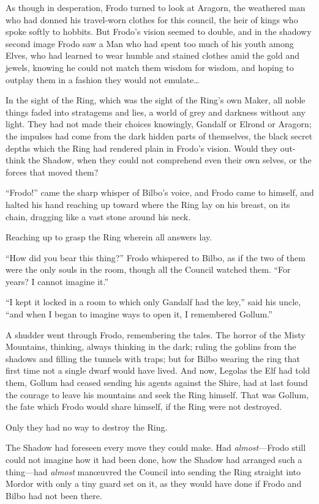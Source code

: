 As though in desperation, Frodo turned to look at Aragorn, the weathered man who had donned his travel-worn clothes for this council, the heir of kings who spoke softly to hobbits. But Frodo’s vision seemed to double, and in the shadowy second image Frodo saw a Man who had spent too much of his youth among Elves, who had learned to wear humble and stained clothes amid the gold and jewels, knowing he could not match them wisdom for wisdom, and hoping to outplay them in a fashion they would not emulate…

In the sight of the Ring, which was the sight of the Ring’s own Maker, all noble things faded into stratagems and lies, a world of grey and darkness without any light. They had not made their choices knowingly, Gandalf or Elrond or Aragorn; the impulses had come from the dark hidden parts of themselves, the black secret depths which the Ring had rendered plain in Frodo’s vision. Would they out-think the Shadow, when they could not comprehend even their own selves, or the forces that moved them?

“Frodo!” came the sharp whisper of Bilbo’s voice, and Frodo came to himself, and halted his hand reaching up toward where the Ring lay on his breast, on its chain, dragging like a vast stone around his neck.

Reaching up to grasp the Ring wherein all answers lay.

“How did you bear this thing?” Frodo whispered to Bilbo, as if the two of them were the only souls in the room, though all the Council watched them. “For years? I cannot imagine it.”

“I kept it locked in a room to which only Gandalf had the key,” said his uncle, “and when I began to imagine ways to open it, I remembered Gollum.”

A shudder went through Frodo, remembering the tales. The horror of the Misty Mountains, thinking, always thinking in the dark; ruling the goblins from the shadows and filling the tunnels with traps; but for Bilbo wearing the ring that first time not a single dwarf would have lived. And now, Legolas the Elf had told them, Gollum had ceased sending his agents against the Shire, had at last found the courage to leave his mountains and seek the Ring himself. That was Gollum, the fate which Frodo would share himself, if the Ring were not destroyed.

Only they had no way to destroy the Ring.

The Shadow had foreseen every move they could make. Had \emph{almost}—Frodo still could not imagine how it had been done, how the Shadow had arranged such a thing—had \emph{almost} manœuvred the Council into sending the Ring straight into Mordor with only a tiny guard set on it, as they would have done if Frodo and Bilbo had not been there.

